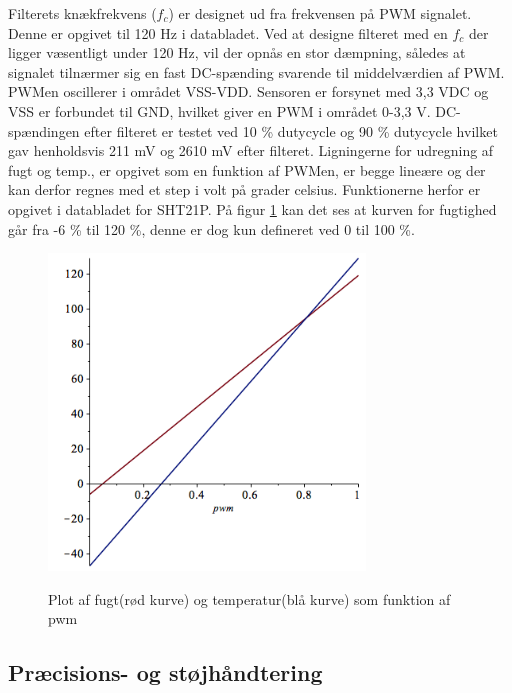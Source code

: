Filterets knækfrekvens ($f_c$) er designet ud fra frekvensen på PWM signalet. Denne er opgivet til 120 Hz i databladet. Ved at designe filteret med en $f_c$ der ligger væsentligt under 120 Hz, vil der opnås en stor dæmpning, således at signalet tilnærmer sig en fast DC-spænding svarende til middelværdien af PWM. PWMen oscillerer i området VSS-VDD. Sensoren er forsynet med 3,3 VDC og VSS er forbundet til GND, hvilket giver en PWM i området 0-3,3 V. DC-spændingen efter filteret er testet ved 10 \% dutycycle og 90 \% dutycycle hvilket gav henholdsvis 211 mV og 2610 mV efter filteret. Ligningerne for udregning af fugt og temp., er opgivet som en funktion af PWMen, er begge lineære og der kan derfor regnes med et step i volt på grader celsius. Funktionerne herfor er opgivet i databladet for SHT21P. 
På figur \ref{lab:sht_plot_mable} kan det ses at kurven for fugtighed går fra -6 \% til 120 \%, denne er dog kun defineret ved 0 til 100 \%. 

\begin{figure}[htb]
\centering
{\includegraphics[width=0.75\textwidth]{filer/design/Billeder/sht_plot_maple.png}}
\caption{Plot af fugt(rød kurve) og temperatur(blå kurve) som funktion af pwm}
\label{lab:sht_plot_mable}
\end{figure}

\subsection{Præcisions- og støjhåndtering}

